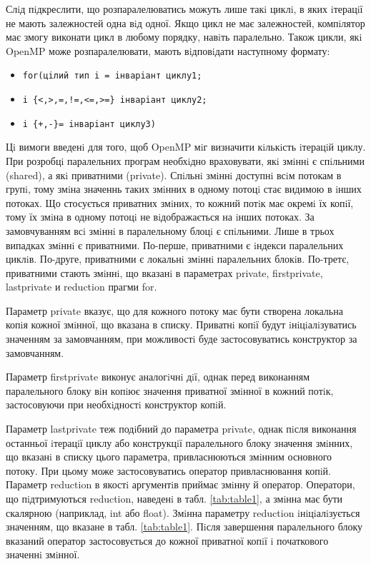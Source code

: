 Слiд пiдкреслити, що розпаралелюватись можуть лише такi циклi, в яких iтерацiї не мають залежностей одна вiд одної. Якщо цикл не  має залежностей, компiлятор має змогу виконати цикл в любому порядку, навiть паралельно. Також цикли, якi OpenMP може розпаралелювати, мають вiдповiдати наступному формату:

\begin{itemize}
\item \verb'for(цiлий тип i = iнварiант циклу1;'
\item \verb'i {<,>,=,!=,<=,>=} iнварiант циклу2;' 
\item \verb'i {+,-}= iнварiант циклу3)'
\end{itemize}

Цi вимоги введенi для того, щоб OpenMP мiг визначити кiлькiсть iтерацiй циклу. При розробцi паралельних програм необхiдно враховувати, якi змiннi є спiльними (shared), а якi приватними (private). Спiльнi змiннi доступнi всiм потокам в групi, тому змiна значеннь таких змiнних в одному потоцi стає видимою в iнших потоках. Що стосується приватних змiних, то кожний потiк має окремi їх копiї, тому їх змiна в одному потоцi не вiдображається на iнших потоках. За замовчуванням всi змiннi в паралельному блоцi є спiльними. Лише в трьох випадках змiннi є приватними. По-перше, приватними є iндекси паралельних циклiв. По-друге, приватними є локальнi змiннi паралельних блокiв. По-третє, приватними стають змiннi, що вказанi в параметрах private, firstprivate, lastprivate и reduction прагми for.

Параметр private вказує, що для кожного потоку має бути створена локальна копiя кожної змiнної, що вказана в списку. Приватнi копiї будут iнiцiалiзуватись значенням за замовчанням, при можливостi буде застосовуватись конструктор за замовчанням.

Параметр firstprivate виконує аналогiчнi дiї, однак перед виконанням паралельного блоку вiн копiює значення приватної змiнної в кожний потiк, застосовуючи при необхiдностi конструктор копiй.

Параметр lastprivate теж подiбний до параметра private, однак пiсля виконання останньої iтерацiї циклу або конструкцiї паралельного блоку значення змiнних, що вказанi в списку цього параметра, привласнюються змiнним основного потоку. При цьому може застосовуватись оператор привласнювання копiй.
Параметр reduction в якостi аргументiв приймає змiнну й оператор. Оператори, що пiдтримуються reduction, наведенi в табл. \ref{tab:table1}, а змiнна має бути скалярною (наприклад, int або float). Змiнна параметру reduction iнiцiалiзується значенням, що вказане в табл. \ref{tab:table1}. Пiсля завершення паралельного блоку вказаний оператор застосовується до кожної приватної копiї i початкового значеннi змiнної.

